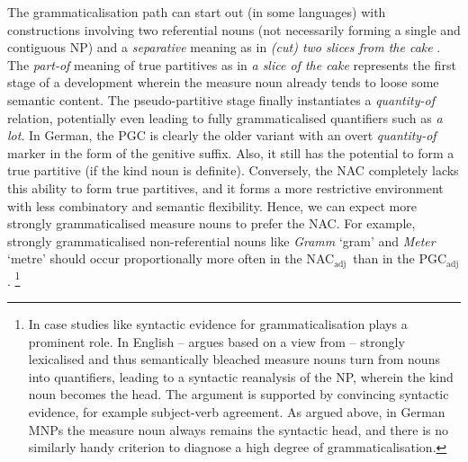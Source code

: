 \documentclass[USenglish]{article}
\newcommand{\Sub}[1]{\ensuremath{\mathrm{_{#1}}}}
\newcommand{\NACa}{NAC\Sub{adj}}
\newcommand{\PGCa}{PGC\Sub{adj}}
\begin{document}
The grammaticalisation path can start out (in some languages) with constructions involving two referential nouns (not necessarily forming a single and contiguous NP) and a \textit{separative} meaning as in \textit{(cut) two slices from the cake} \citep[535]{Koptjevskaja2001}.
The \textit{part-of} meaning of true partitives as in \textit{a slice of the cake} represents the first stage of a development wherein the measure noun already tends to loose some semantic content.
The pseudo-partitive stage finally instantiates a \textit{quantity-of} relation, potentially even leading to fully grammaticalised quantifiers such as \textit{a lot}.
In German, the PGC is clearly the older variant \citep{Zimmer2015} with an overt \textit{quantity-of} marker in the form of the genitive suffix.
Also, it still has the potential to form a true partitive (if the kind noun is definite).
Conversely, the NAC completely lacks this ability to form true partitives, and it forms a more restrictive environment with less combinatory and semantic flexibility.
Hence, we can expect more strongly grammaticalised measure nouns to prefer the NAC.
For example, strongly grammaticalised non-referential nouns like \textit{Gramm} `gram' and \textit{Meter} `metre' should occur proportionally more often in the \NACa\ than in the \PGCa.%
\footnote{In case studies like \cite{Brems2003,DeclerckBrems2016} syntactic evidence for grammaticalisation plays a prominent role.
In English -- \cite{Brems2003} argues based on a view from \cite{Langacker1991} -- strongly lexicalised and thus semantically bleached measure nouns turn from nouns into quantifiers, leading to a syntactic reanalysis of the NP, wherein the kind noun becomes the head.
The argument is supported by convincing syntactic evidence, for example subject-verb agreement.
As argued above, in German MNPs the measure noun always remains the syntactic head, and there is no similarly handy criterion to diagnose a high degree of grammaticalisation.}
\end{document}
